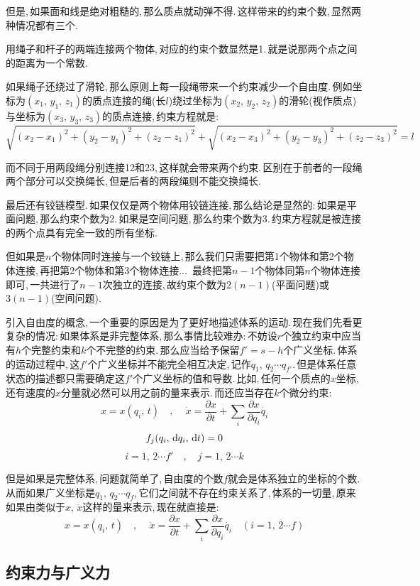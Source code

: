 但是,\,如果面和线是绝对粗糙的,\,那么质点就动弹不得.\,这样带来的约束个数,\,显然两种情况都有三个.

用绳子和杆子的两端连接两个物体,\,对应的约束个数显然是1.\,就是说那两个点之间的距离为一个常数.

如果绳子还绕过了滑轮,\,那么原则上每一段绳带来一个约束减少一个自由度.\,例如坐标为$(x_1,\,y_1,\,z_1)$的质点连接的绳(长$l$)绕过坐标为$(x_2,\,y_2,\,z_2)$的滑轮(视作质点)与坐标为$(x_3,\,y_3,\,z_3)$的质点连接,\,约束方程就是:
\[\sqrt{(x_2-x_1)^2+(y_2-y_1)^2+(z_2-z_1)^2}+\sqrt{(x_2-x_3)^2+(y_2-y_3)^2+(z_2-z_3)^2}=l\]

而不同于用两段绳分别连接12和23,\,这样就会带来两个约束.\,区别在于前者的一段绳两个部分可以交换绳长,\,但是后者的两段绳则不能交换绳长.

最后还有铰链模型.\,如果仅仅是两个物体用铰链连接,\,那么结论是显然的:\,如果是平面问题,\,那么约束个数为2.\,如果是空间问题,\,那么约束个数为3.\,约束方程就是被连接的两个点具有完全一致的所有坐标.

但如果是$n$个物体同时连接与一个铰链上,\,那么我们只需要把第1个物体和第2个物体连接,\,再把第2个物体和第3个物体连接...\, 最终把第$n-1$个物体同第$n$个物体连接即可,\,一共进行了$n-1$次独立的连接,\,故约束个数为$2(n-1)$(平面问题)或$3(n-1)$(空间问题).

引入自由度的概念,\,一个重要的原因是为了更好地描述体系的运动.\,现在我们先看更复杂的情况:\,如果体系是非完整体系,\,那么事情比较难办:\,不妨设$r$个独立约束中应当有$h$个完整约束和$k$个不完整的约束.\,那么应当给予保留$f'=s-h$个广义坐标.\,体系的运动过程中,\,这$f'$个广义坐标并不能完全相互决定,\,记作$q_1,\,q_2\cdots q_{f'}$.\,但是体系任意状态的描述都只需要确定这$f'$个广义坐标的值和导数.\,比如,\,任何一个质点的$x$坐标,\,还有速度的$x$分量就必然可以用之前的量来表示.\,而还应当存在$k$个微分约束:
\[x=x(q_i,\,t)\quad,\,\quad \dot{x}=\frac{\partial x}{\partial t}+\sum_i \frac{\partial x}{\partial q_i}\dot{q_i}\]
\[f_j(q_i,\,\textrm{d} q_i,\,\textrm{d} t)=0\]
\[i=1,\,2\cdots f' \quad,\quad j=1,\,2\cdots k\]

但是如果是完整体系,\,问题就简单了,\,自由度的个数$f$就会是体系独立的坐标的个数.\,从而如果广义坐标是$q_1,\,q_2\cdots q_f$,\,它们之间就不存在约束关系了,\,体系的一切量,\,原来如果由类似于$x,\,\dot{x}$这样的量来表示,\,现在就直接是:
\[x=x(q_i,\,t)\quad,\,\quad \dot{x}=\frac{\partial x}{\partial t}+\sum_i \frac{\partial x}{\partial q_i}\dot{q_i}\quad (i=1,\,2\cdots f)\]




\subsection{约束力与广义力}

